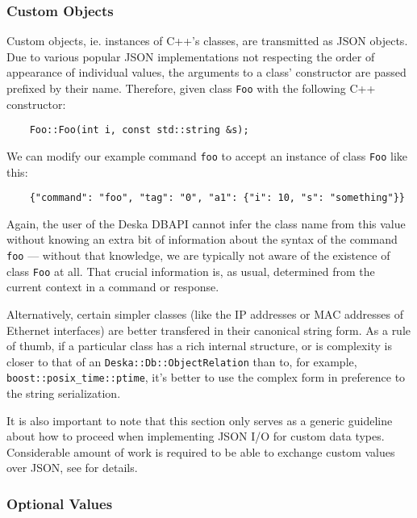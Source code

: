 \documentclass[deska]{subfiles}
\begin{document}
\subsubsection{Custom Objects}

Custom objects, ie. instances of C++'s classes, are transmitted as JSON objects. Due to various popular JSON
implementations not respecting the order of appearance of individual values, the arguments to a class' constructor are
passed prefixed by their name.  Therefore, given class {\tt Foo} with the following C++ constructor:

\begin{verbatim}
    Foo::Foo(int i, const std::string &s);
\end{verbatim}

We can modify our example command {\tt foo} to accept an instance of class {\tt Foo} like this:

\begin{verbatim}
    {"command": "foo", "tag": "0", "a1": {"i": 10, "s": "something"}}
\end{verbatim}

Again, the user of the Deska DBAPI cannot infer the class name from this value without knowing an extra bit of
information about the syntax of the command {\tt foo} --- without that knowledge, we are typically not aware of the
existence of class {\tt Foo} at all.  That crucial information is, as usual, determined from the current context in a
command or response.

Alternatively, certain simpler classes (like the IP addresses or MAC addresses of Ethernet interfaces) are better
transfered in their canonical string form.  As a rule of thumb, if a particular class has a rich internal structure, or
is complexity is closer to that of an {\tt Deska::Db::ObjectRelation} than to, for example, {\tt
boost::posix\_time::ptime}, it's better to use the complex form in preference to the string serialization.

It is also important to note that this section only serves as a generic guideline about how to proceed when implementing
JSON I/O for custom data types.  Considerable amount of work is required to be able to exchange custom values over JSON,
see  for details.

\subsubsection{Optional Values}
\end{document}
